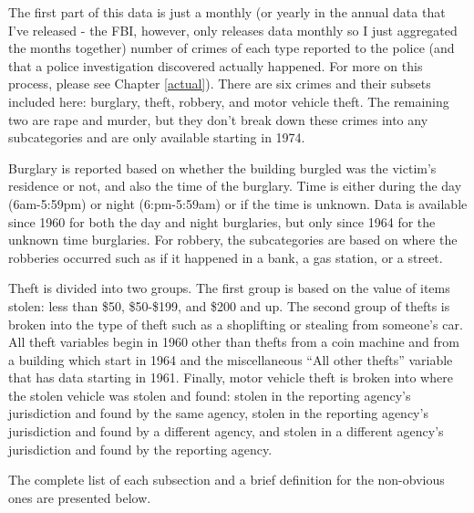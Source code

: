 \documentclass[
  12pt,
  openany]{book}
\begin{document}
The first part of this data is just a monthly (or yearly in the annual data that I've released - the FBI, however, only releases data monthly so I just aggregated the months together) number of crimes of each type reported to the police (and that a police investigation discovered actually happened. For more on this process, please see Chapter \ref{actual}). There are six crimes and their subsets included here: burglary, theft, robbery, and motor vehicle theft. The remaining two are rape and murder, but they don't break down these crimes into any subcategories and are only available starting in 1974.

Burglary is reported based on whether the building burgled was the victim's residence or not, and also the time of the burglary. Time is either during the day (6am-5:59pm) or night (6:pm-5:59am) or if the time is unknown. Data is available since 1960 for both the day and night burglaries, but only since 1964 for the unknown time burglaries. For robbery, the subcategories are based on where the robberies occurred such as if it happened in a bank, a gas station, or a street.

Theft is divided into two groups. The first group is based on the value of items stolen: less than \$50, \$50-\$199, and \$200 and up. The second group of thefts is broken into the type of theft such as a shoplifting or stealing from someone's car. All theft variables begin in 1960 other than thefts from a coin machine and from a building which start in 1964 and the miscellaneous ``All other thefts'' variable that has data starting in 1961. Finally, motor vehicle theft is broken into where the stolen vehicle was stolen and found: stolen in the reporting agency's jurisdiction and found by the same agency, stolen in the reporting agency's jurisdiction and found by a different agency, and stolen in a different agency's jurisdiction and found by the reporting agency.

The complete list of each subsection and a brief definition for the non-obvious ones are presented below.
\end{document}
